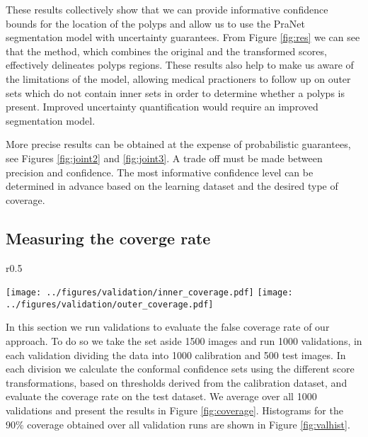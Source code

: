 These results collectively show that we can provide informative confidence bounds for the location of the polyps and allow us to use the PraNet segmentation model with uncertainty guarantees. From Figure \ref{fig:res} we can see that the method, which combines the original and the transformed scores, effectively delineates polyps regions. These results also help to make us aware of the limitations of the model, allowing medical practioners to follow up on outer sets which do not contain inner sets in order to determine whether a polyps is present. Improved uncertainty quantification would require an improved segmentation model. 

More precise results can be obtained at the expense of probabilistic guarantees, see Figures \ref{fig:joint2} and \ref{fig:joint3}. A trade off must be made between precision and confidence. The most informative confidence level can be determined in advance based on the learning dataset and the desired type of coverage.


\subsection{Measuring the coverge rate}\label{SS:cov}
\begin{wrapfigure}{r}{0.5\textwidth}
		\vspace{-0.8cm}
		\begin{center}
			\texttt{[image: ../figures/validation/inner\_coverage.pdf]}
			\texttt{[image: ../figures/validation/outer\_coverage.pdf]}
			\vspace{-0.5cm}
		\end{center}
		\caption{Coverage levels of the inner and outer sets averaged over 1000 validations for the original, distance transformed (DT) and bounding box (BB) scores.}\label{fig:coverage}
		\vspace{-0.55cm}
	\end{wrapfigure}
In this section we run validations to evaluate the false coverage rate of our approach. To do so we take the set aside 1500 images and run 1000 validations, in each validation dividing the data into 1000 calibration and 500 test images. In each division we calculate the conformal confidence sets using the different score transformations, based on thresholds derived from the calibration dataset, and evaluate the coverage rate on the test dataset. We average over all 1000 validations and present the results in Figure \ref{fig:coverage}. Histograms for the $90\%$ coverage obtained over all validation runs are shown in Figure \ref{fig:valhist}. 

